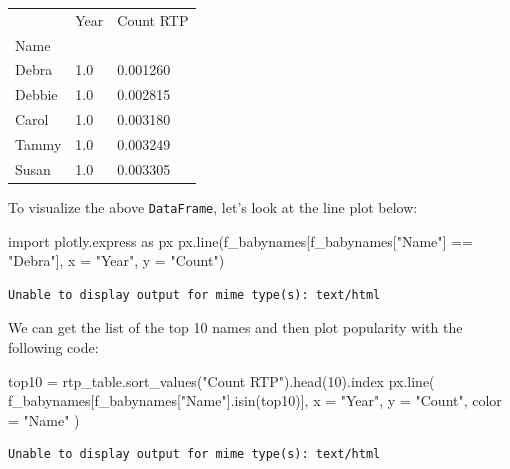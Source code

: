 \documentclass[
  letterpaper,
  DIV=11,
  numbers=noendperiod]{scrreprt}
\newenvironment{Shaded}{\begin{snugshade}}{\end{snugshade}}
\newcommand{\DecValTok}[1]{\textcolor[rgb]{0.68,0.00,0.00}{#1}}
\newcommand{\ImportTok}[1]{\textcolor[rgb]{0.00,0.46,0.62}{#1}}
\newcommand{\NormalTok}[1]{\textcolor[rgb]{0.00,0.23,0.31}{#1}}
\newcommand{\OperatorTok}[1]{\textcolor[rgb]{0.37,0.37,0.37}{#1}}
\newcommand{\StringTok}[1]{\textcolor[rgb]{0.13,0.47,0.30}{#1}}
\begin{document}
\begin{longtable}[]{@{}lll@{}}
\toprule\noalign{}
& Year & Count RTP \\
Name & & \\
\midrule\noalign{}
\endhead
\bottomrule\noalign{}
\endlastfoot
Debra & 1.0 & 0.001260 \\
Debbie & 1.0 & 0.002815 \\
Carol & 1.0 & 0.003180 \\
Tammy & 1.0 & 0.003249 \\
Susan & 1.0 & 0.003305 \\
\end{longtable}

To visualize the above \texttt{DataFrame}, let's look at the line plot
below:

\begin{Shaded}
\begin{Highlighting}[]
\ImportTok{import}\NormalTok{ plotly.express }\ImportTok{as}\NormalTok{ px}
\NormalTok{px.line(f\_babynames[f\_babynames[}\StringTok{"Name"}\NormalTok{] }\OperatorTok{==} \StringTok{"Debra"}\NormalTok{], x }\OperatorTok{=} \StringTok{"Year"}\NormalTok{, y }\OperatorTok{=} \StringTok{"Count"}\NormalTok{)}
\end{Highlighting}
\end{Shaded}

\begin{verbatim}
Unable to display output for mime type(s): text/html
\end{verbatim}

We can get the list of the top 10 names and then plot popularity with
the following code:

\begin{Shaded}
\begin{Highlighting}[]
\NormalTok{top10 }\OperatorTok{=}\NormalTok{ rtp\_table.sort\_values(}\StringTok{"Count RTP"}\NormalTok{).head(}\DecValTok{10}\NormalTok{).index}
\NormalTok{px.line(}
\NormalTok{    f\_babynames[f\_babynames[}\StringTok{"Name"}\NormalTok{].isin(top10)], }
\NormalTok{    x }\OperatorTok{=} \StringTok{"Year"}\NormalTok{, }
\NormalTok{    y }\OperatorTok{=} \StringTok{"Count"}\NormalTok{, }
\NormalTok{    color }\OperatorTok{=} \StringTok{"Name"}
\NormalTok{)}
\end{Highlighting}
\end{Shaded}

\begin{verbatim}
Unable to display output for mime type(s): text/html
\end{verbatim}
\end{document}
